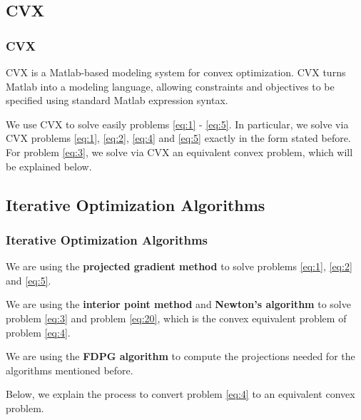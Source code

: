 \documentclass{beamer}
\begin{document}
\subsection{CVX}

\begin{frame}
\frametitle{\textbf{CVX}}

\justifying
CVX is a Matlab-based modeling system for convex optimization. CVX turns Matlab into a modeling language, allowing constraints and objectives to be specified using standard Matlab expression syntax.

\vspace{0.4cm}
\justifying
We use CVX to solve easily problems \eqref{eq:1} - \eqref{eq:5}. In particular, we solve via CVX problems \eqref{eq:1}, \eqref{eq:2}, \eqref{eq:4} and \eqref{eq:5} exactly in the form stated before. For problem \eqref{eq:3}, we solve via CVX an equivalent convex problem, which will be explained below.

\end{frame}




\subsection{Iterative Optimization Algorithms}

\begin{frame}
\frametitle{\textbf{Iterative Optimization Algorithms}}

\justifying
We are using the \textbf{projected gradient method} to solve problems \eqref{eq:1}, \eqref{eq:2} and \eqref{eq:5}.

\vspace{0.6cm}
\justifying
We are using the \textbf{interior point method} and \textbf{Newton's algorithm} to solve problem \eqref{eq:3} and problem \eqref{eq:20}, which is the convex equivalent problem of problem \eqref{eq:4}.

\vspace{0.6cm}
\justifying
We are using the \textbf{FDPG algorithm} to compute the projections needed for the algorithms mentioned before.

\vspace{0.6cm}
\justifying
Below, we explain the process to convert problem \eqref{eq:4} to an equivalent convex problem.

\end{frame}
\end{document}
